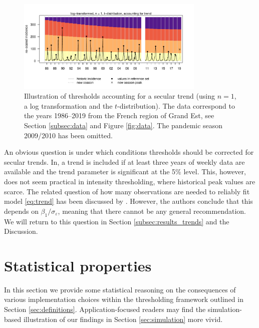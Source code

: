 \documentclass[12pt]{article}
\begin{document}
\begin{figure}[h!]
\begin{center}
\includegraphics[width = 0.8\textwidth]{figure/illustration_trend.pdf}\vspace{-5mm}
\end{center}
\caption{Illustration of thresholds accounting for a secular trend (using $n = 1$, a log transformation and the $t$-distribution). The data correspond to the years 1986--2019 from the French region of Grand Est, see Section \ref{subsec:data} and Figure \ref{fig:data}. The pandemic season 2009/2010 has been omitted.}
\label{fig:illustration_trend}
\end{figure}



An obvious question is under which conditions thresholds should be corrected for secular trends. In\cite{Farrington1996}, a trend is included if at least three years of weekly data are available and the trend parameter is significant at the 5\% level. This, however, does not seem practical in intensity thresholding, where historical peak values are scarce. The related question of how many observations are needed to reliably fit model \eqref{eq:trend} has been discussed by \cite{Hyndman2007}. However, the authors conclude that this depends on $\beta_1/\sigma_\varepsilon$, meaning that there cannot be any general recommendation. We will return to this question in Section \ref{subsec:results_trends} and the Discussion.

 
\section{Statistical properties}
\label{sec:analytical_results}

In this section we provide some statistical reasoning on the consequences of various implementation choices within the thresholding framework outlined in Section \ref{sec:definitions}. Application-focused readers may find the simulation-based illustration of our findings in Section \ref{sec:simulation} more vivid.
\end{document}
